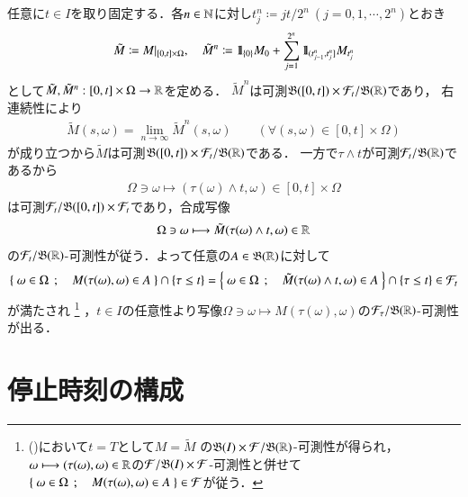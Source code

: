 	\begin{prf}
		任意に$t \in I$を取り固定する．各$n \in \mathbb{N}$に対し$t_j^n \coloneqq jt/2^n\ (j=0,1,\cdots,2^n)$とおき
		\begin{align}
			\tilde{M} \coloneqq M|_{[0,t] \times \Omega},
			\quad \tilde{M}^{n} \coloneqq \mbox{1}\hspace{-0.25em}\mbox{l}_{\{0\}} M_0 + \sum_{j=1}^{2^n} \mbox{1}\hspace{-0.25em}\mbox{l}_{(t_{j-1}^n,t_j^n]} M_{t_j^n}
		\end{align}
		として$\tilde{M},\tilde{M}^n:[0,t] \times \Omega \rightarrow \mathbb{R}$を定める．
		$\tilde{M}^n$は可測$\mathfrak{B}([0,t]) \times \mathcal{F}_t/\mathfrak{B}(\mathbb{R})$であり，
		右連続性により
		\begin{align}
			\tilde{M}(s,\omega) = \lim_{n \to \infty} \tilde{M}^n(s,\omega) \quad
			\quad \left( \forall (s, \omega) \in [0,t] \times \Omega \right)
			\label{eq:stopping_time_measurability}
		\end{align}
		が成り立つから$\tilde{M}$は可測$\mathfrak{B}([0,t]) \times \mathcal{F}_t/\mathfrak{B}(\mathbb{R})$である．
		一方で$\tau \wedge t$が可測$\mathcal{F}_t/\mathfrak{B}(\mathbb{R})$であるから
		\begin{align}
			\Omega \ni \omega \longmapsto (\tau(\omega) \wedge t, \omega) \in [0,t] \times \Omega
		\end{align}
		は可測$\mathcal{F}_t/\mathfrak{B}([0,t]) \times \mathcal{F}_t$であり，合成写像
		\begin{align}
			\Omega \ni \omega \longmapsto \tilde{M}(\tau(\omega) \wedge t,\omega) \in \mathbb{R}
		\end{align}
		の$\mathcal{F}_t/\mathfrak{B}(\mathbb{R})$-可測性が従う．よって任意の$A \in \mathfrak{B}(\mathbb{R})$に対して
		\begin{align}
			\left\{\ \omega \in \Omega\ \, ; \quad M(\tau(\omega),\omega) \in A\ \right\} \cap \left\{ \tau \leq t \right\}
			= \left\{\ \omega \in \Omega\ \, ; \quad \tilde{M}(\tau(\omega) \wedge t,\omega) \in A\ \right\} \cap \left\{ \tau \leq t \right\}
			\in \mathcal{F}_t
		\end{align}
		が満たされ
		\footnote{
			()において$t = T$として$M = \tilde{M}$
			の$\mathfrak{B}(I) \times \mathcal{F}/\mathfrak{B}(\mathbb{R})$-可測性が得られ，
			$\omega \longmapsto (\tau(\omega),\omega) \in \mathbb{R}$の$\mathcal{F}/\mathfrak{B}(I) \times \mathcal{F}$-可測性と併せて
			$\left\{\ \omega \in \Omega\ \, ; \quad M(\tau(\omega),\omega) \in A\ \right\} \in \mathcal{F}$が従う．
		}
		，$t \in I$の任意性より写像$\Omega \ni \omega \longmapsto M(\tau(\omega),\omega)$の$\mathcal{F}_\tau/\mathfrak{B}(\mathbb{R})$-可測性が出る．
		\QED
	\end{prf}

\section{停止時刻の構成}

